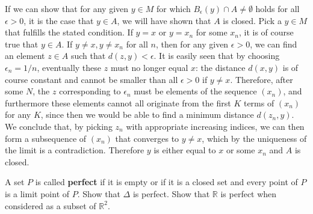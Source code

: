 \begin{solution}
    
    If we can show that for any given $y \in M$ for which $B_{\epsilon}(y) \cap A \neq \emptyset$ holds for all $\epsilon > 0$, it is the case that $y \in A$, we will have shown that $A$ is closed.
    Pick a $y \in M$ that fulfills the stated condition.
    If $y = x$ or $y = x_n$ for some $x_n$, it is of course true that $y \in A$.
    If $y \neq x, y \neq x_n$ for all $n$, then for any given $\epsilon > 0$, we can find an element $z \in A$ such that $d(z, y) < \epsilon$.
    It is easily seen that by choosing $\epsilon_n = 1/n$, eventually these $z$ must no longer equal $x$: the distance $d(x, y)$ is of course constant and cannot be smaller than all $\epsilon > 0$ if $y \neq x$.
    Therefore, after some $N$, the $z$ corresponding to $\epsilon_n$ must be elements of the sequence $(x_n)$, and furthermore these elements cannot all originate from the first $K$ terms of $(x_n)$ for any $K$, since then we would be able to find a minimum distance $d(z_n, y)$.
    We conclude that, by picking $z_n$ with appropriate increasing indices, we can then form a subsequence of $(x_n)$ that converges to $y \neq x$, which by the uniqueness of the limit is a contradiction.
    Therefore $y$ is either equal to $x$ or some $x_n$ and $A$ is closed.
    

\end{solution}

\begin{exercise}{38}
    A set $P$ is called \textbf{perfect} if it is empty or if it is a closed set and every point of $P$ is a limit point of $P$.
    Show that $\Delta$ is perfect.
    Show that $\mathbb{R}$ is perfect when considered as a subset of $\mathbb{R}^2$.
\end{exercise}

